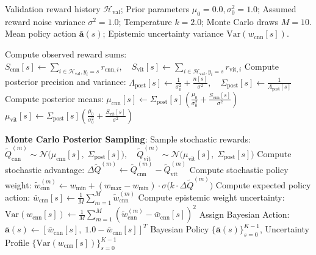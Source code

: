 \documentclass[10pt,journal,compsoc]{IEEEtran}
\begin{document}
\begin{algorithm}[H]
\caption{Bayesian Thompson Sampling Policy Action Generation}
\label{alg:thompson}
\begin{algorithmic}[1]
\REQUIRE Validation reward history $\mathcal{H}_{\text{val}}$; Prior parameters $\mu_0 = 0.0, \sigma_0^2 = 1.0$; Assumed reward noise variance $\sigma^2 = 1.0$; Temperature $k=2.0$; Monte Carlo draws $M=10$.
\ENSURE Mean policy action $\bar{\mathbf{a}}(s)$; Epistemic uncertainty variance $\text{Var}(w_{\text{cnn}}[s])$.

    \STATE Compute observed reward sums:
    \STATE \quad $S_{\text{cnn}}[s] \leftarrow \sum_{i \in \mathcal{H}_{\text{val}}, y_i=s} r_{\text{cnn}, i}, \quad S_{\text{vit}}[s] \leftarrow \sum_{i \in \mathcal{H}_{\text{val}}, y_i=s} r_{\text{vit}, i}$
    \STATE Compute posterior precision and variance:
    \STATE \quad $\Lambda_{\text{post}}[s] \leftarrow \frac{1}{\sigma_0^2} + \frac{n[s]}{\sigma^2}, \quad \Sigma_{\text{post}}[s] \leftarrow \frac{1}{\Lambda_{\text{post}}[s]}$
    \STATE Compute posterior means:
    \STATE \quad $\mu_{\text{cnn}}[s] \leftarrow \Sigma_{\text{post}}[s] \left( \frac{\mu_0}{\sigma_0^2} + \frac{S_{\text{cnn}}[s]}{\sigma^2} \right)$
    \STATE \quad $\mu_{\text{vit}}[s] \leftarrow \Sigma_{\text{post}}[s] \left( \frac{\mu_0}{\sigma_0^2} + \frac{S_{\text{vit}}[s]}{\sigma^2} \right)$
    
    \STATE \textbf{Monte Carlo Posterior Sampling}:
        \STATE Sample stochastic rewards:
        \STATE \quad $\tilde{Q}_{\text{cnn}}^{(m)} \sim \mathcal{N}\big(\mu_{\text{cnn}}[s], \; \Sigma_{\text{post}}[s]\big), \quad \tilde{Q}_{\text{vit}}^{(m)} \sim \mathcal{N}\big(\mu_{\text{vit}}[s], \; \Sigma_{\text{post}}[s]\big)$
        \STATE Compute stochastic advantage: $\Delta \tilde{Q}^{(m)} \leftarrow \tilde{Q}_{\text{cnn}}^{(m)} - \tilde{Q}_{\text{vit}}^{(m)}$
        \STATE Compute stochastic policy weight:
        \STATE \quad $\tilde{w}_{\text{cnn}}^{(m)} \leftarrow w_{\min} + (w_{\max} - w_{\min}) \cdot \sigma\big(k \cdot \Delta \tilde{Q}^{(m)}\big)$
    \ENDFOR
    \STATE Compute expected policy action: $\bar{w}_{\text{cnn}}[s] \leftarrow \frac{1}{M}\sum_{m=1}^M \tilde{w}_{\text{cnn}}^{(m)}$
    \STATE Compute epistemic weight uncertainty: $\text{Var}(w_{\text{cnn}}[s]) \leftarrow \frac{1}{M}\sum_{m=1}^M (\tilde{w}_{\text{cnn}}^{(m)} - \bar{w}_{\text{cnn}}[s])^2$
    \STATE Assign Bayesian Action: $\bar{\mathbf{a}}(s) \leftarrow [\bar{w}_{\text{cnn}}[s], \; 1.0 - \bar{w}_{\text{cnn}}[s]]^T$
\ENDFOR
\RETURN Bayesian Policy $\{\bar{\mathbf{a}}(s)\}_{s=0}^{K-1}$, Uncertainty Profile $\{\text{Var}(w_{\text{cnn}}[s])\}_{s=0}^{K-1}$
\end{algorithmic}
\end{algorithm}
\end{document}
